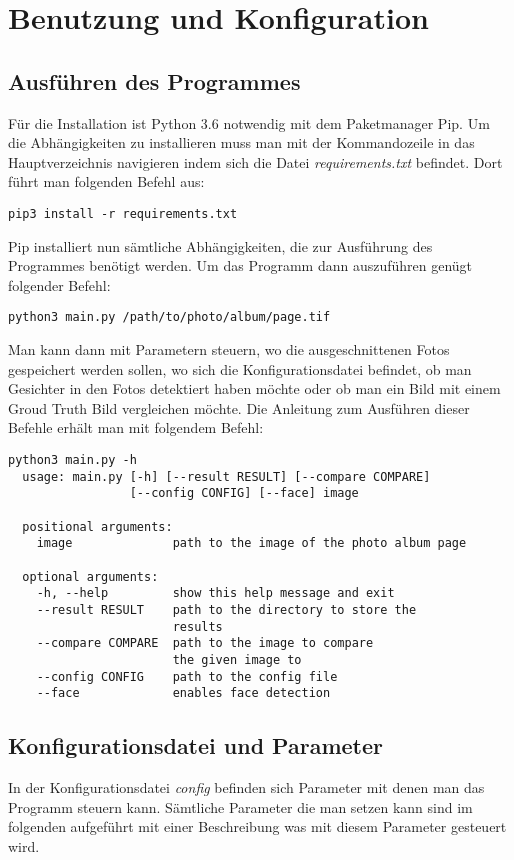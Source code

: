 \chapter{Benutzung und Konfiguration}

\section{Ausführen des Programmes}

Für die Installation ist Python 3.6 notwendig mit dem Paketmanager Pip. Um die Abhängigkeiten zu installieren muss man mit der Kommandozeile in das Hauptverzeichnis navigieren indem sich die Datei \textit{requirements.txt} befindet. Dort führt man folgenden Befehl aus: 
\begin{lstlisting}
pip3 install -r requirements.txt
\end{lstlisting}
Pip installiert nun sämtliche Abhängigkeiten, die zur Ausführung des Programmes benötigt werden. Um das Programm dann auszuführen genügt folgender Befehl:
\begin{lstlisting}
python3 main.py /path/to/photo/album/page.tif
\end{lstlisting}
Man kann dann mit Parametern steuern, wo die ausgeschnittenen Fotos gespeichert werden sollen, wo sich die Konfigurationsdatei befindet, ob man Gesichter in den Fotos detektiert haben möchte oder ob man ein Bild mit einem Groud Truth Bild vergleichen möchte. Die Anleitung zum Ausführen dieser Befehle erhält man mit folgendem Befehl:
\newpage
\begin{lstlisting}
python3 main.py -h 
  usage: main.py [-h] [--result RESULT] [--compare COMPARE] 
                 [--config CONFIG] [--face] image

  positional arguments:
    image              path to the image of the photo album page

  optional arguments:
    -h, --help         show this help message and exit
    --result RESULT    path to the directory to store the 
                       results
    --compare COMPARE  path to the image to compare 
                       the given image to
    --config CONFIG    path to the config file
    --face             enables face detection
\end{lstlisting}  

\section{Konfigurationsdatei und Parameter}
In der Konfigurationsdatei \textit{config} befinden sich Parameter mit denen man das Programm steuern kann. Sämtliche Parameter die man setzen kann sind im folgenden aufgeführt mit einer Beschreibung was mit diesem Parameter gesteuert wird.

